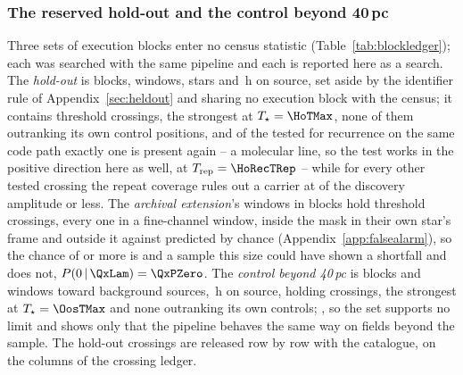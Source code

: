 \subsubsection{The reserved hold-out and the control beyond 40\,pc}
\label{sec:holdoutsearch}

Three sets of execution blocks enter no census statistic
(Table~\ref{tab:blockledger}); each was searched with the same pipeline and
each is reported here as a search. The \emph{hold-out} is \HoNBlock{} blocks,
\HoNWin{} windows, \HoNStar{} stars and \HoHours\,h on source, set aside by the
identifier rule of Appendix~\ref{sec:heldout} and sharing no execution block
with the census; it contains \HoNCross{} threshold crossings, the strongest at
$T_\star=\HoTMax$, none of them outranking its own control positions, and of
the \HoNTested{} tested for recurrence on the same code path exactly one is
present again -- a molecular line, so the test works in the positive direction
here as well, at $T_{\rm rep}=\HoRecTRep$ -- while for every other tested
crossing the repeat coverage rules out a carrier at \HoFracMax{} of the
discovery amplitude or less. The \emph{archival extension}'s \LdgExtWin{}
windows in \LdgExtEB{} blocks hold \QxObsCross{} threshold crossings, every one
in a fine-channel window, \QxObsAttr{} inside the mask in their own star's
frame and \QxObsUnattr{} outside it against \QxLam{} predicted by chance
(Appendix~\ref{app:falsealarm}), so the chance of \QxObsUnattr{} or more is
\QxPGe{} and a sample this size could have shown a shortfall and does not,
$P(0\,|\,\QxLam)=\QxPZero$. The \emph{control beyond 40\,pc} is \OosNBlock{}
blocks and \OosNWin{} windows toward \OosNStar{} background sources,
\OosHours\,h on source, holding \OosNCross{} crossings, the strongest at
$T_\star=\OosTMax$ and none outranking its own controls; \OosVsysClause, so the
set supports no limit and shows only that the pipeline behaves the same way on
fields beyond the sample. The hold-out crossings are released row by row with
the catalogue, on the columns of the crossing ledger.

